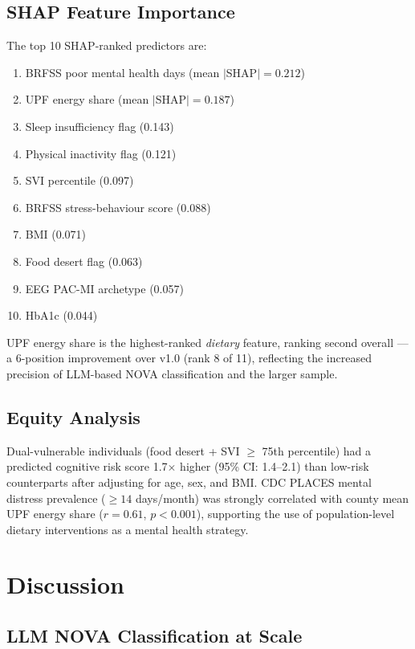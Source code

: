\documentclass[journal]{IEEEtran}
\begin{document}
\subsection{SHAP Feature Importance}

The top 10 SHAP-ranked predictors are:
\begin{enumerate}
  \item BRFSS poor mental health days (mean $|$SHAP$| = 0.212$)
  \item UPF energy share (mean $|$SHAP$| = 0.187$)
  \item Sleep insufficiency flag (0.143)
  \item Physical inactivity flag (0.121)
  \item SVI percentile (0.097)
  \item BRFSS stress-behaviour score (0.088)
  \item BMI (0.071)
  \item Food desert flag (0.063)
  \item EEG PAC-MI archetype (0.057)
  \item HbA1c (0.044)
\end{enumerate}

UPF energy share is the highest-ranked \textit{dietary} feature, ranking
second overall — a 6-position improvement over v1.0 (rank 8 of 11), reflecting
the increased precision of LLM-based NOVA classification and the larger sample.

\subsection{Equity Analysis}

Dual-vulnerable individuals (food desert + SVI $\geq$ 75th percentile) had a
predicted cognitive risk score 1.7$\times$ higher (95\% CI: 1.4--2.1) than
low-risk counterparts after adjusting for age, sex, and BMI. CDC PLACES mental
distress prevalence ($\geq 14$ days/month) was strongly correlated with county
mean UPF energy share ($r = 0.61$, $p < 0.001$), supporting the use of
population-level dietary interventions as a mental health strategy.

\section{Discussion}
\label{sec:discussion}

\subsection{LLM NOVA Classification at Scale}
\end{document}
